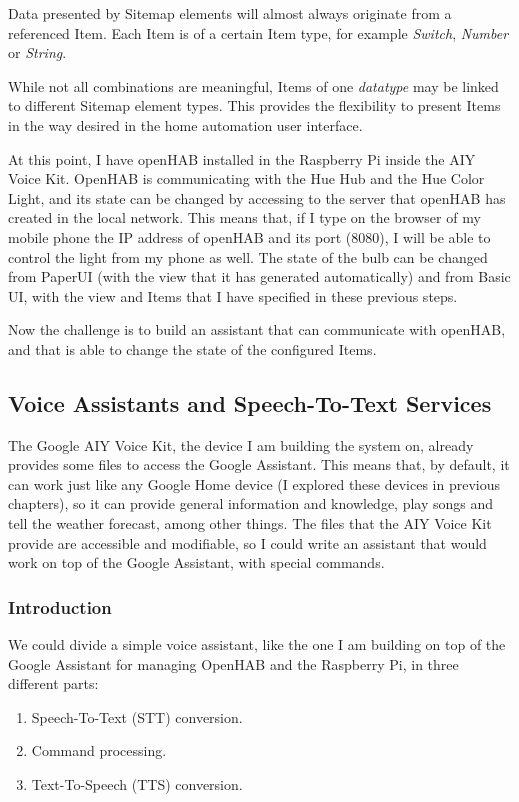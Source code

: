 Data presented by Sitemap elements will almost always originate from a referenced Item. Each Item is of a certain Item type, for 
example \textit{Switch}, \textit{Number} or \textit{String}.

While not all combinations are meaningful, Items of one \textit{datatype} may be linked to different Sitemap element types. This 
provides the flexibility to present Items in the way desired in the home automation user interface.

\bigskip
At this point, I have openHAB installed in the Raspberry Pi inside the AIY Voice Kit. OpenHAB is communicating with the Hue Hub and
the Hue Color Light, and its state can be changed by accessing to the server that openHAB has created in the local network. This means
that, if I type on the browser of my mobile phone the IP address of openHAB and its port (8080), I will be able to control the light from
my phone as well. The state of the bulb can be changed from PaperUI (with the view that it has generated automatically) and from 
Basic UI, with the view and Items that I have specified in these previous steps.

Now the challenge is to build an assistant that can communicate with openHAB, and that is able to change the state of the configured
Items.

\subsection{Voice Assistants and Speech-To-Text Services}
The Google AIY Voice Kit, the device I am building the system on, already provides some files to access the Google Assistant. This
means that, by default, it can work just like any Google Home device (I explored these devices in previous chapters), so it can
provide general information and knowledge, play songs and tell the weather forecast, among other things. The files that the AIY Voice
Kit provide are accessible and modifiable, so I could write an assistant that would work on top of the Google Assistant, with special
commands.

\subsubsection{Introduction}
We could divide a simple voice assistant, like the one I am building on top of the Google Assistant for managing OpenHAB and the 
Raspberry Pi, in three different parts:
\begin{enumerate}
	\item Speech-To-Text (STT) conversion.
	\item Command processing.
	\item Text-To-Speech (TTS) conversion.
\end{enumerate}

